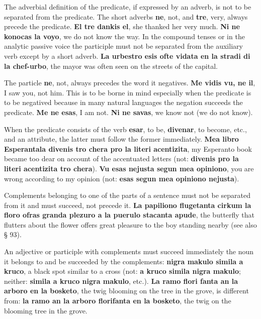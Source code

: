 The adverbial definition of the predicate, if expressed by an adverb, is not to be separated from the predicate. The short adverbs \textbf{ne}, not, and \textbf{tre}, very, always precede the predicate. \textbf{El tre dankis el}, she thanked her very much. \textbf{Ni ne konocas la voyo}, we do not know the way. In the compound tenses or in the analytic passive voice the participle must not be separated from the auxiliary verb except by a short adverb. \textbf{La urbestro esis ofte vidata en la stradi di la chef-urbo}, the mayor was often seen on the streets of the capital. 

The particle \textbf{ne}, not, always precedes the word it negatives. \textbf{Me vidis vu, ne il}, I saw you, not him. This is to be borne in mind especially when the predicate is to be negatived because in many natural languages the negation succeeds the predicate. \textbf{Me ne esas}, I am not. \textbf{Ni ne savas}, we know not (we do not know). 

When the predicate consists of the verb \textbf{esar}, to be, \textbf{divenar}, to become, etc., and an attribute, the latter must follow the former immediately. \textbf{Mea libro Esperantala divenis tro chera pro la literi acentizita}, my Esperanto book became too dear on account of the accentuated letters (not: \textbf{divenis pro la literi acentizita tro chera}). \textbf{Vu esas nejusta segun mea opiniono}, you are wrong according to my opinion (not: \textbf{esas segun mea opiniono nejusta}). 

Complements belonging to one of the parts of a sentence must not be separated from it and must succeed, not precede it. \textbf{La papiliono flugetanta cirkum la floro ofras granda plezuro a la puerulo stacanta apude}, the butterfly that flutters about the flower offers great pleasure to the boy standing nearby (see also § 93). 

An adjective or participle with complements must succeed immediately the noun it belongs to and be succeeded by the complements: \textbf{nigra makulo simila a kruco}, a black spot similar to a cross (not: \textbf{a kruco simila nigra makulo}; neither: \textbf{simila a kruco nigra makulo}, etc.). \textbf{La ramo flori fanta an la arboro en la bosketo}, the twig blooming on the tree in the grove, is different from: \textbf{la ramo an la arboro florifanta en la bosketo}, the twig on the blooming tree in the grove. 

